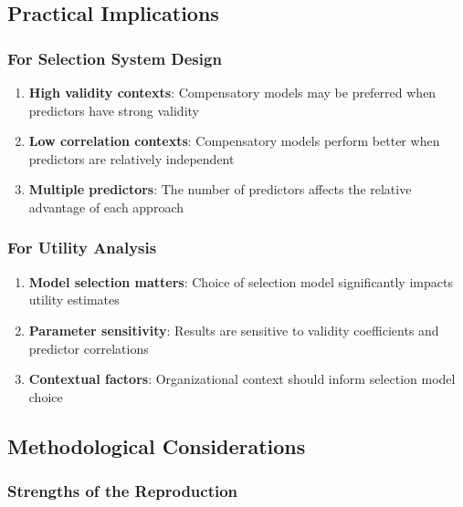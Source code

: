 \documentclass[
]{article}
\providecommand{\tightlist}{%
  \setlength{\itemsep}{0pt}\setlength{\parskip}{0pt}}
\begin{document}
\subsection{Practical Implications}\label{practical-implications}

\subsubsection{For Selection System
Design}\label{for-selection-system-design}

\begin{enumerate}
\def\labelenumi{\arabic{enumi}.}
\tightlist
\item
  \textbf{High validity contexts}: Compensatory models may be preferred
  when predictors have strong validity
\item
  \textbf{Low correlation contexts}: Compensatory models perform better
  when predictors are relatively independent
\item
  \textbf{Multiple predictors}: The number of predictors affects the
  relative advantage of each approach
\end{enumerate}

\subsubsection{For Utility Analysis}\label{for-utility-analysis}

\begin{enumerate}
\def\labelenumi{\arabic{enumi}.}
\tightlist
\item
  \textbf{Model selection matters}: Choice of selection model
  significantly impacts utility estimates
\item
  \textbf{Parameter sensitivity}: Results are sensitive to validity
  coefficients and predictor correlations
\item
  \textbf{Contextual factors}: Organizational context should inform
  selection model choice
\end{enumerate}

\subsection{Methodological
Considerations}\label{methodological-considerations}

\subsubsection{Strengths of the
Reproduction}\label{strengths-of-the-reproduction}
\end{document}
